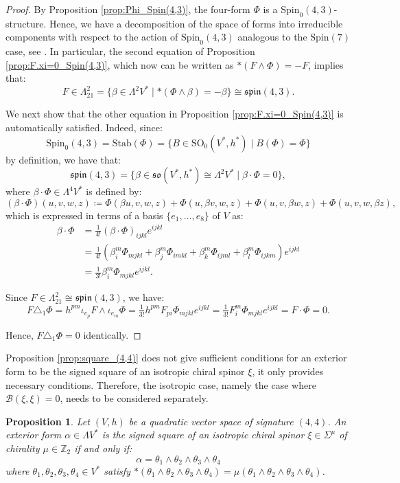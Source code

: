 \documentclass[10pt,reqno]{amsart}
\newtheorem{proposition}[theorem]{Proposition}
\theoremstyle{definition}
\theoremstyle{remark}
\newcommand{\Z}{\mathbb{Z}}
\begin{document}
\begin{proof}
    By Proposition \ref{prop:Phi_Spin(4,3)}, the four-form $\Phi$ is a $\mathrm{Spin}_0(4,3)$-structure. Hence, we have a decomposition of the space of forms into irreducible components with respect to the action of $\mathrm{Spin}_0(4,3)$ analogous to the $\mathrm{Spin}(7)$ case, see \cite{Bryant1987}. In particular, the second equation of Proposition \ref{prop:F.xi=0_Spin(4,3)}, which now can be written as $*(F\wedge\Phi)=-F$, implies that: $$F\in\Lambda^2_{21}=\{\beta\in\Lambda^2V^*\mid*(\Phi\wedge\beta)=-\beta\}\cong\mathfrak{spin}(4,3).$$
    
    We next show that the other equation in Proposition \ref{prop:F.xi=0_Spin(4,3)} is automatically satisfied. Indeed, since: $$\mathrm{Spin}_0(4,3)=\mathrm{Stab}(\Phi)=\{B\in\mathrm{SO}_0(V^*,h^*)\mid B(\Phi)=\Phi\}$$ by definition, we have that: $$\mathfrak{spin}(4,3)=\{\beta\in\mathfrak{so}(V^*,h^*)\cong\Lambda^2V^*\mid\beta\cdot\Phi=0\},$$ where $\beta\cdot\Phi\in\Lambda^4V^*$ is defined by: $$(\beta\cdot\Phi)(u,v,w,z)\coloneqq\Phi(\beta u,v,w,z)+\Phi(u,\beta v,w,z)+\Phi(u,v,\beta w,z)+\Phi(u,v,w,\beta z),$$ which is expressed in terms of a basis $\{e_1,\ldots,e_8\}$ of $V$ as: \begin{align*}
        \beta\cdot\Phi&=\tfrac{1}{4!}(\beta\cdot\Phi)_{ijkl}e^{ijkl}\\
        &=\tfrac{1}{4!}(\beta_i^m\Phi_{mjkl}+\beta_j^m\Phi_{imkl}+\beta_k^m\Phi_{ijml}+\beta_l^m\Phi_{ijkm})e^{ijkl}\\
        &=\tfrac{1}{3!}\beta_i^m\Phi_{mjkl}e^{ijkl}.
    \end{align*}

    Since $F\in\Lambda^2_{21}\cong\mathfrak{spin}(4,3)$, we have: $$F\triangle_1\Phi=h^{pm}\iota_{e_p}F\wedge\iota_{e_m}\Phi=\tfrac{1}{3!}h^{pm}F_{pi}\Phi_{mjkl}e^{ijkl}=\tfrac{1}{3!}F^m_i\Phi_{mjkl}e^{ijkl}=F\cdot\Phi=0.$$
    
    Hence, $F\triangle_1\Phi=0$ identically.
\end{proof}

Proposition \ref{prop:square_(4,4)} does not give sufficient conditions for an exterior form to be the signed square of an isotropic chiral spinor $\xi$, it only provides necessary conditions. Therefore, the isotropic case, namely the case where $\mathscr{B}(\xi,\xi)=0$, needs to be considered separately.

\begin{proposition}\label{prop:isotropic_square_(4,4)}
    Let $(V,h)$ be a quadratic vector space of signature $(4,4)$. An exterior form $\alpha\in\Lambda V^*$ is the signed square of an isotropic chiral spinor $\xi\in\Sigma^\mu$ of chirality $\mu\in\Z_2$ if and only if: $$\alpha=\theta_1\wedge\theta_2\wedge\theta_3\wedge\theta_4$$ where $\theta_1,\theta_2,\theta_3,\theta_4\in V^*$ satisfy $*(\theta_1\wedge\theta_2\wedge\theta_3\wedge\theta_4)=\mu(\theta_1\wedge\theta_2\wedge\theta_3\wedge\theta_4)$.
\end{proposition}
\end{document}
